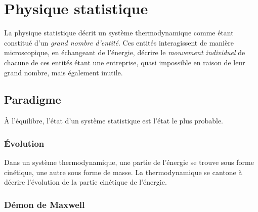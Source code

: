 

\section{Physique statistique}

La physique statistique décrit un système thermodynamique comme étant constitué d'un {\it grand nombre d'entité}. Ces entités interagissent de manière microscopique, en échangeant de l'énergie, décrire le {\it mouvement individuel} de chacune de ces entités étant une entreprise, quasi impossible en raison de leur grand nombre, mais également inutile.

  \subsection{Paradigme}

À l'équilibre, l'état d'un système statistique est l'état le plus probable.

  \subsubsection{Évolution}

Dans un système thermodynamique, une partie de l'énergie se trouve sous forme cinétique, une autre sous forme de masse. La thermodynamique se cantone à décrire l'évolution de la partie cinétique de l'énergie.

  \subsubsection{Démon de Maxwell}





